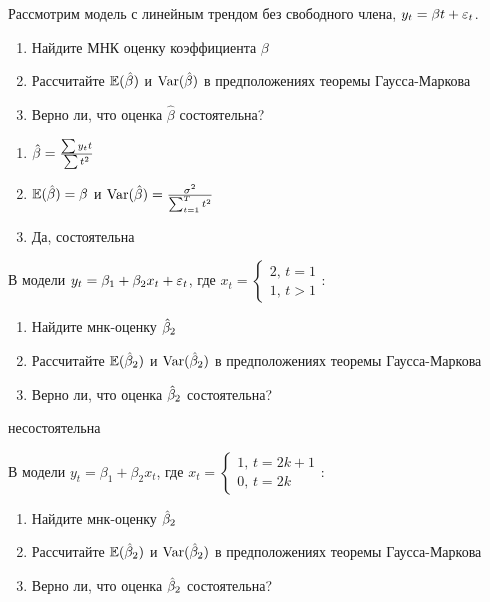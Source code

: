 \documentclass[pdftex,11pt,openany]{book}
\begin{document}
\begin{problem}
 Рассмотрим модель с линейным трендом без свободного члена, $y_t=\beta t +\varepsilon_t$. 
\begin{enumerate}
\item Найдите МНК оценку коэффициента $\beta$
\item Рассчитайте $\mathbb{E}(\hat{\beta})$ и $\operatorname{Var}(\hat{\beta})$ в предположениях теоремы Гаусса-Маркова
\item Верно ли, что оценка $\hat{\beta}$ состоятельна?
\end{enumerate}
\end{problem}
 

\begin{solution}
\begin{enumerate}
\item $\hat{\beta}=\frac{\sum y_t t}{\sum t^2}$
\item $\mathbb{E}(\hat{\beta})=\beta$ и $\operatorname{Var}(\hat{\beta})=\frac{\sigma^2}{\sum_{t=1}^{T} t^2}$
\item Да, состоятельна
\end{enumerate}
\end{solution}


\begin{problem}
 В модели $y_t=\beta_1+\beta_2 x_t+\varepsilon_t$, где 
$x_t=\left\{
\begin{array}{l}
2,\, t=1 \\
1,\, t>1
\end{array}
\right.
$:
\begin{enumerate}
\item Найдите мнк-оценку $\hat{\beta}_2$
\item Рассчитайте $\mathbb{E}(\hat{\beta}_2)$ и $\operatorname{Var}(\hat{\beta}_2)$ в предположениях теоремы Гаусса-Маркова
\item Верно ли, что оценка $\hat{\beta}_2$ состоятельна?
\end{enumerate}
\end{problem}

\begin{solution}
несостоятельна
\end{solution}


\begin{problem}
 В модели $y_t=\beta_1+\beta_2 x_t$, где 
$x_t=\left\{
\begin{array}{l}
1,\, t=2k+1 \\
0,\, t=2k
\end{array}
\right.
$:
\begin{enumerate}
\item Найдите мнк-оценку $\hat{\beta}_2$
\item Рассчитайте $\mathbb{E}(\hat{\beta}_2)$ и $\operatorname{Var}(\hat{\beta}_2)$ в предположениях теоремы Гаусса-Маркова
\item Верно ли, что оценка $\hat{\beta}_2$ состоятельна?
\end{enumerate}
\end{problem}
\end{document}
